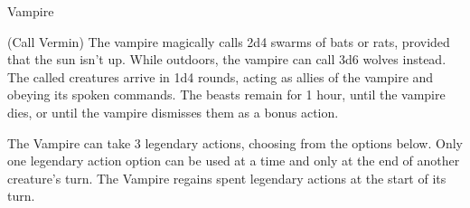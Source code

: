 \begin{DndMonster}[float*=b,width=\textwidth + 8pt]{Vampire}
\begin{multicols}{2}
\DndMonsterAction(Call Vermin)
The vampire magically calls 2d4 swarms of bats or rats, provided that the sun isn't up. While outdoors, the vampire can call 3d6 wolves instead. The called creatures arrive in 1d4 rounds, acting as allies of the vampire and obeying its spoken commands. The beasts remain for 1 hour, until the vampire dies, or until the vampire dismisses them as a bonus action.

The Vampire can take 3 legendary actions, choosing from the options below. Only one legendary action option can be used at a time and only at the end of another creature's turn. The Vampire regains spent legendary actions at the start of its turn.
\begin{DndMonsterLegendaryActions}
\end{DndMonsterLegendaryActions}
\end{multicols}
\end{DndMonster}

